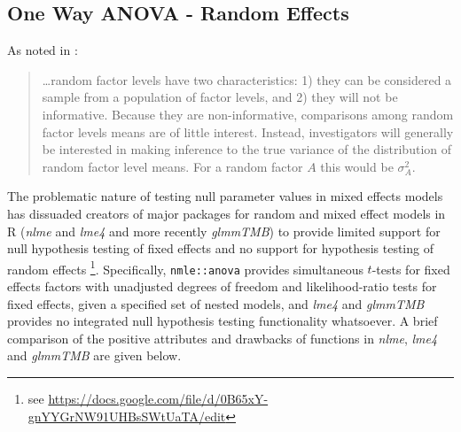 \documentclass[12pt,english]{article}\usepackage[]{graphicx}\usepackage[table]{xcolor}
\begin{document}
\subsection{One Way ANOVA - Random Effects}
 \noindent As noted in \citet{aho2014}:

\begin{quote}
\dots random factor levels have two characteristics: 1) they can be considered a sample from a population of factor levels, and 2) they will not be informative.  Because they are non-informative, comparisons among random factor levels means are of little interest. Instead, investigators will generally be interested in making inference to the true variance of the distribution of random factor level means.  For a random factor $A$ this would be $\sigma^2_A$.\\
\end{quote}


\noindent The problematic nature of testing null parameter values in mixed effects models \citep[see][]{aho2014} has dissuaded creators of major packages for random and mixed effect models in R (\textit{nlme} and \textit{lme4} and more recently \textit{glmmTMB}) to provide limited support for null hypothesis testing of fixed effects and no support for hypothesis testing of random effects \footnote{see \url{https://docs.google.com/file/d/0B65xY-gnYYGrNW91UHBsSWtUaTA/edit}}. Specifically,  \texttt{nmle::anova} provides simultaneous $t$-tests for fixed effects factors with unadjusted degrees of freedom and likelihood-ratio tests for fixed effects, given a specified set of nested models, and \textit{lme4} and \textit{glmmTMB} provides no integrated null hypothesis testing functionality whatsoever. A brief comparison of the positive attributes and drawbacks of functions in \textit{nlme}, \textit{lme4} and \textit{glmmTMB} are given below.\\
\end{document}
